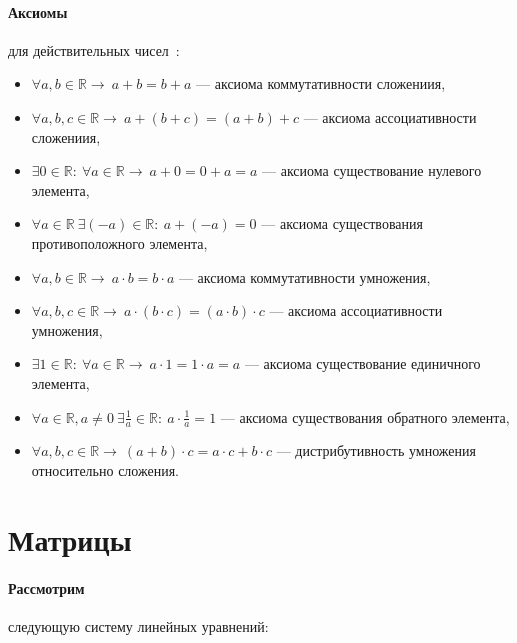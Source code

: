 \documentclass[12pt, twoside]{article}
\begin{document}
\paragraph{Аксиомы} для действительных чисел~\cite{Besov}:
\begin{itemize}
	\item $\forall a,b \in \mathbb{R}\rightarrow~a+b=b+a$ --- аксиома коммутативности сложениия,
	\item $\forall a,b,c \in \mathbb{R}\rightarrow~a+(b+c)=(a+b)+c$ --- аксиома ассоциативности сложениия,
	\item $\exists 0 \in \mathbb{R}:~\forall a \in \mathbb{R}\rightarrow~a+0=0+a=a$ --- аксиома существование нулевого элемента,
	\item $\forall a \in \mathbb{R}~\exists(-a)\in\mathbb{R}:~a+(-a)=0$ --- аксиома существования противоположного элемента,
	
	\item $\forall a,b \in \mathbb{R}\rightarrow~a\cdot b=b\cdot a$ --- аксиома коммутативности умножения,
	\item $\forall a,b,c \in \mathbb{R}\rightarrow~a\cdot(b\cdot c)=(a\cdot b)\cdot c$ --- аксиома ассоциативности умножения,
	\item $\exists 1 \in \mathbb{R}:~\forall a \in \mathbb{R}\rightarrow~a\cdot1=1\cdot a=a$ --- аксиома существование единичного элемента,
	\item $\forall a \in \mathbb{R}, a\not=0~\exists\frac{1}{a}\in\mathbb{R}:~a\cdot\frac{1}{a}=1$ --- аксиома существования обратного элемента,
	
	\item $\forall a,b,c \in \mathbb{R} \rightarrow~ (a+b)\cdot c = a\cdot c + b\cdot c$ --- дистрибутивность умножения относительно сложения.
\end{itemize}

\section{Матрицы}

\paragraph{Рассмотрим} следующую систему линейных уравнений:
\end{document}
